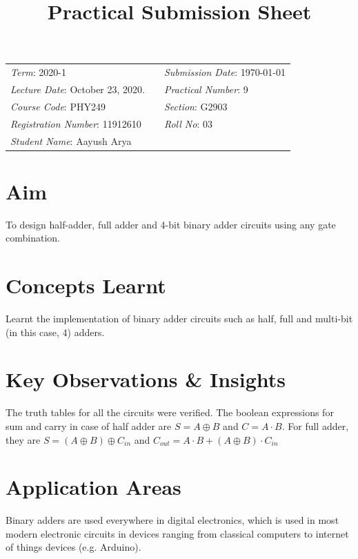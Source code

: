 \documentclass{article}
\title{Practical Submission Sheet}
\date{}
\begin{document}
	\maketitle
	
	\hrulefill
	\begin{center}
		\begin{tabular}{lll}
			\textit{Term}: 2020-1 & & \hfill \textit{Submission Date}: \today\\
			\textit{Lecture Date}: October 23, 2020. & & \textit{Practical Number}: 9\\
			\textit{Course Code}: PHY249 & & \textit{Section}: G2903\\
			\textit{Registration Number}: 11912610 & & \textit{Roll No}: 03\\
			\textit{Student Name}: Aayush Arya & & \\
		\end{tabular}
	\end{center}
	
	\hrulefill
	
	\section*{Aim} To design half-adder, full adder and 4-bit binary adder circuits using any gate combination.
	
	\section*{Concepts Learnt}	
	Learnt the implementation of binary adder circuits such as half, full and multi-bit (in this case, 4) adders.
	
	\section*{Key Observations \& Insights}
	The truth tables for all the circuits were verified. The boolean expressions for sum and carry in case of half adder are $S = A \oplus B $ and $C = A\cdot B$. For full adder, they are $S = (A \oplus B) \oplus C_{in}$ and $C_{out} = A\cdot B + (A\oplus B)\cdot C_{in}$
	
	\section*{Application Areas}
	Binary adders are used everywhere in digital electronics,  which is used in most modern electronic circuits in devices ranging from classical computers to internet of things devices (e.g. Arduino).
	
\end{document}
